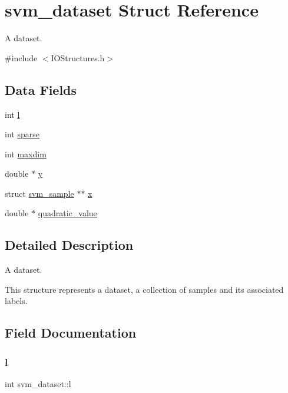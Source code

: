 \hypertarget{structsvm__dataset}{}\section{svm\+\_\+dataset Struct Reference}
\label{structsvm__dataset}


A dataset.  




{\ttfamily \#include $<$I\+O\+Structures.\+h$>$}

\subsection*{Data Fields}
\begin{DoxyCompactItemize}
\item 
int \hyperlink{structsvm__dataset_a899bdc43cdfb5e7063e8d7d1787357b4}{l}
\item 
int \hyperlink{structsvm__dataset_a58e8012a38ef5ea1c642db1b8c06b8bc}{sparse}
\item 
int \hyperlink{structsvm__dataset_aec1d1ee62ef8204fe90d8c6b7a647177}{maxdim}
\item 
double $\ast$ \hyperlink{structsvm__dataset_a2bce5da2f59f28fe18eff3f92f92c011}{y}
\item 
struct \hyperlink{structsvm__sample}{svm\+\_\+sample} $\ast$$\ast$ \hyperlink{structsvm__dataset_ad3e266a07c610ed3f10df1bab30fd9e5}{x}
\item 
double $\ast$ \hyperlink{structsvm__dataset_a4b1ff8b06358c73f6b55ecae7516d01e}{quadratic\+\_\+value}
\end{DoxyCompactItemize}


\subsection{Detailed Description}
A dataset. 

This structure represents a dataset, a collection of samples and its associated labels. 

\subsection{Field Documentation}
\hypertarget{structsvm__dataset_a899bdc43cdfb5e7063e8d7d1787357b4}{}\label{structsvm__dataset_a899bdc43cdfb5e7063e8d7d1787357b4} 
\subsubsection{\texorpdfstring{l}{l}}
{\ttfamily int svm\+\_\+dataset\+::l}

